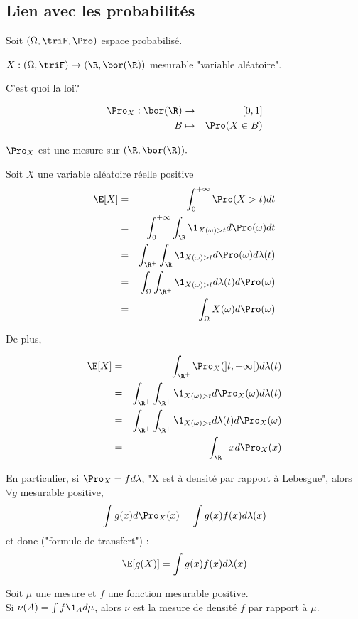 \subsection{Lien avec les probabilités}




Soit $(\Omega, \triF, \Pro)$ espace probabilisé.

$X : (\Omega,    \triF) \to (\R,  \bor(\R)) $ mesurable "variable aléatoire".

C'est quoi la loi?

\begin{eqnarray*}
	\Pro_X: \bor (\R) &\to& [0,1] \\
	B &\mapsto& \Pro(X  \in B)
\end{eqnarray*}

$\Pro_X$ est une mesure sur $(\R,  \bor(\R)).$

Soit $X$ une variable aléatoire réelle positive\\
\begin{eqnarray*}
	\E[X] &=& \int_0^{+\infty} \Pro (X> t) d t\\
	&=& \int_0^{+\infty}\int_\R \1_{X(\omega)>t}d \Pro (\omega) d t\\
	&=& \int_{\R^+} \int_{\R} \1_{X(\omega)>t}d \Pro (\omega) d \lambda(t) \\ %
	&=& \int_{\Omega} \int_{\R^+} \1_{X(\omega)>t}d \lambda(t) d \Pro (\omega)  \\%
	&=& \int_{\Omega} X(\omega) d \Pro(\omega)
\end{eqnarray*}

De plus,


\begin{eqnarray*}
	\E[X] &=& \int_{\R^+} \Pro_X(]t, +\infty[) d \lambda (t) \\
	&=& \int_{\R^+} \int_{\R^+} \1_{X(\omega)>t}d \Pro_X (\omega) d \lambda(t) \\
	&=& \int_{\R^+} \int_{\R^+} \1_{X(\omega)>t}d \lambda(t) d\Pro_X (\omega)  \\ %
	&=& \int_{\R^+} x d\Pro_X (x)
\end{eqnarray*}

En particulier, si $\Pro_X = fd\lambda$, "X est à densité par rapport à Lebesgue", alors $\forall g$ mesurable positive,
$$\int g(x) d \Pro_X(x) = \int g(x) f(x) d \lambda(x)$$
et donc ("formule de transfert") :
$$ \E[g(X)] = \int g(x) f(x) d \lambda(x)$$

\begin{example}
	Soit $\mu$ une mesure et $f$ une fonction mesurable positive.\\
	Si $\nu(A) = \int f \1_A d \mu$, alors $\nu$ est la mesure de densité $f$ par rapport à $\mu$.
\end{example}


